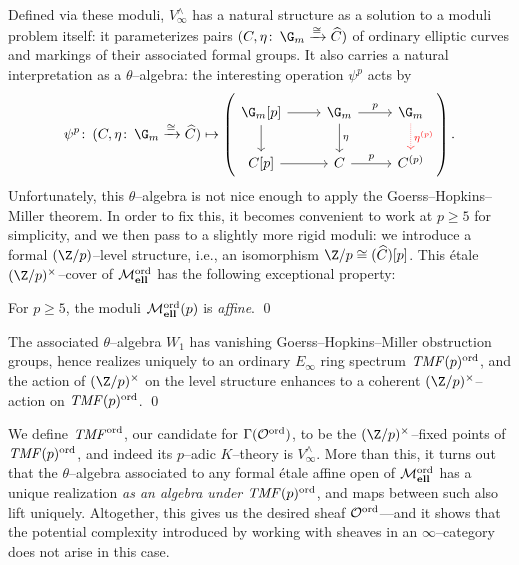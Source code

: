 \noindent Defined via these moduli, $V^\wedge_\infty$ has a natural structure as a solution to a moduli problem itself: it parameterizes pairs $(C, \eta\co \G_m \xrightarrow{\cong} \widehat C)$ of ordinary elliptic curves and markings of their associated formal groups.  It also carries a natural interpretation as a $\theta$--algebra: the interesting operation $\psi^p$ acts by
\[
\psi^p\co (C, \eta\co \G_m \xrightarrow\cong \widehat C) \mapsto \left(
\begin{tikzcd}
\G_m[p] \arrow{r} \arrow{d} & \G_m \arrow["p"]{r} \arrow["\eta"]{d} & \G_m \arrow[densely dotted, red, "\eta^{(p)}"]{d} \\
C[p]\arrow{r} & C \arrow["p"]{r} & C^{(p)}
\end{tikzcd}
\right).
\]
Unfortunately, this $\theta$--algebra is not nice enough to apply the Goerss--Hopkins--Miller theorem.  In order to fix this, it becomes convenient to work at $p \ge 5$ for simplicity, and we then pass to a slightly more rigid moduli: we introduce a formal $(\Z/p)$--level structure, i.e., an isomorphism $\Z/p \cong (\widehat C)[p]$.  This \'etale $(\Z/p)^\times$--cover of $\mathcal{M}_{\mathbf{ell}}^{\mathrm{ord}}$ has the following exceptional property:

\begin{lemma}
For $p \ge 5$, the moduli $\mathcal{M}_{\mathbf{ell}}^{\mathrm{ord}}(p)$ is \emph{affine}. \qed
\end{lemma}

\begin{corollary}
The associated $\theta$--algebra $W_1$ has vanishing Goerss--Hopkins--Miller obstruction groups, hence realizes uniquely to an ordinary $E_\infty$ ring spectrum $\mathit{TMF}(p)^{\mathrm{ord}}$, and the action of $(\Z/p)^\times$ on the level structure enhances to a coherent $(\Z/p)^\times$--action on $\mathit{TMF}(p)^{\mathrm{ord}}$. \qed
\end{corollary}

We define $\mathit{TMF}^{\mathrm{ord}}$, our candidate for $\Gamma(\mathcal{O}^{\mathrm{ord}})$, to be the $(\Z/p)^\times$--fixed points of $\mathit{TMF}(p)^{\mathrm{ord}}$, and indeed its $p$--adic $K$--theory is $V^\wedge_\infty$.  More than this, it turns out that the $\theta$--algebra associated to any formal \'etale affine open of $\mathcal{M}_{\mathbf{ell}}^{\mathrm{ord}}$ has a unique realization \emph{as an algebra under $\mathit{TMF}(p)^{\mathrm{ord}}$}, and maps between such also lift uniquely.  Altogether, this gives us the desired sheaf $\mathcal{O}^{\mathrm{ord}}$---and it shows that the potential complexity introduced by working with sheaves in an $\infty$--category does not arise in this case.

